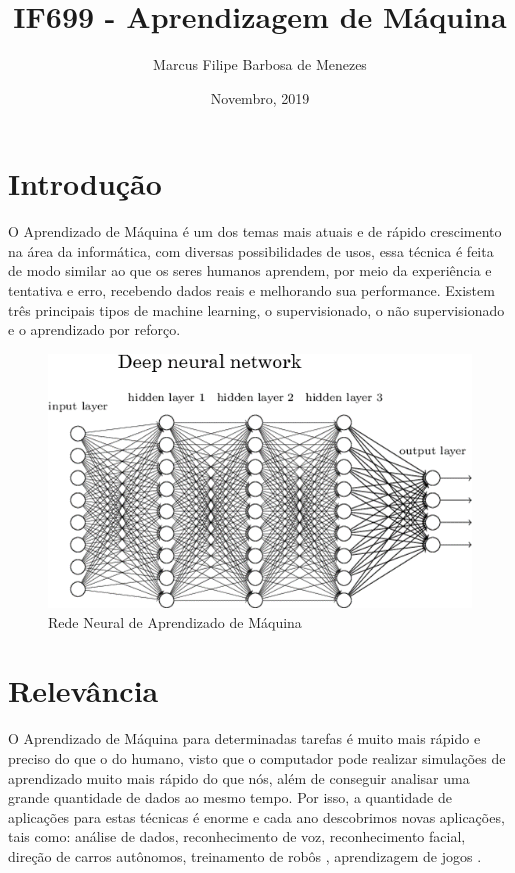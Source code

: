\documentclass{article}
\title{IF699 - Aprendizagem de Máquina}
\author{Marcus Filipe Barbosa de Menezes}
\date{Novembro, 2019}
\begin{document}
\maketitle

\section{Introdução}
O Aprendizado de Máquina é um dos temas mais atuais e de rápido crescimento na área da informática, com diversas possibilidades de usos, essa técnica é feita de modo similar ao que os seres humanos aprendem, por meio da experiência e tentativa e erro, recebendo dados reais e melhorando sua performance. Existem três principais tipos de machine learning, o supervisionado, o não supervisionado e o aprendizado por reforço.\cite{3machinelearning}

\begin{figure}[h!]
\centering
\includegraphics[scale=0.8]{neuralnetwork.png}
\caption{Rede Neural de Aprendizado de Máquina}
\label{fig:Neural Network}
\end{figure}

\section{Relevância}O Aprendizado de Máquina para determinadas tarefas é muito mais rápido e preciso do que o do humano, visto que o computador pode realizar simulações de aprendizado muito mais rápido do que nós, além de conseguir analisar uma grande quantidade de dados ao mesmo tempo. Por isso, a quantidade de aplicações para estas técnicas é enorme e cada ano descobrimos novas aplicações, tais como: análise de dados, reconhecimento de voz, reconhecimento facial, direção de carros autônomos\cite{tesla}, treinamento de robôs \cite{robocin}, aprendizagem de jogos \cite{alphago}.
\end{document}
